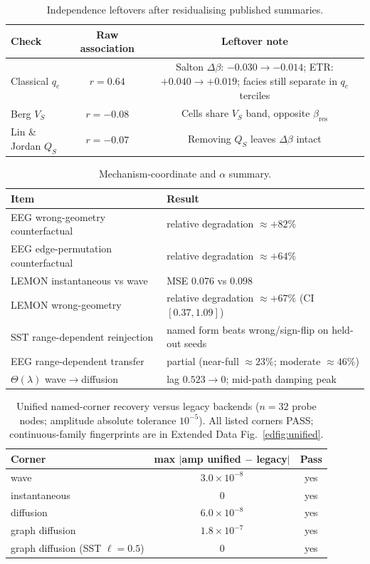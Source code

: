 \documentclass[twocolumn,10pt]{article}
\begin{document}
\begin{table}[!ht]
\centering
\caption{Independence leftovers after residualising published summaries.}
\label{stab:indep}
\begin{tabular}{lcc}
\toprule
Check & Raw association & Leftover note \\
\midrule
Classical \(q_c\) & \(r=0.64\) & Salton \(\Delta\beta\): \(-0.030\rightarrow-0.014\);
 ETR: \(+0.040\rightarrow+0.019\); facies still separate in \(q_c\) terciles \\
Berg \(V_S\) & \(r=-0.08\) & Cells share \(V_S\) band, opposite \(\beta_{\mathrm{res}}\) \\
Lin \& Jordan \(Q_S\) & \(r=-0.07\) & Removing \(Q_S\) leaves \(\Delta\beta\) intact \\
\bottomrule
\end{tabular}
\end{table}

\begin{table}[!ht]
\centering
\caption{Mechanism-coordinate and \(\alpha\) summary.}
\label{stab:alpha}
\begin{tabular}{lp{8.5cm}}
\toprule
Item & Result \\
\midrule
EEG wrong-geometry counterfactual & relative degradation \(\approx+82\%\) \\
EEG edge-permutation counterfactual & relative degradation \(\approx+64\%\) \\
LEMON instantaneous vs wave & MSE \(0.076\) vs \(0.098\) \\
LEMON wrong-geometry & relative degradation \(\approx+67\%\) (CI \([0.37,1.09]\)) \\
SST range-dependent reinjection & named form beats wrong/sign-flip on held-out seeds \\
EEG range-dependent transfer & partial (near-full \(\approx23\%\); moderate \(\approx46\%\)) \\
\(\Theta(\lambda)\) wave\(\rightarrow\)diffusion & lag \(0.523\rightarrow0\); mid-path damping peak \\
\bottomrule
\end{tabular}
\end{table}

\begin{table}[!ht]
\centering
\caption{Unified named-corner recovery versus legacy backends
(\(n=32\) probe nodes; amplitude absolute tolerance \(10^{-5}\)).
All listed corners PASS; continuous-family fingerprints are in Extended Data
Fig.~\ref{edfig:unified}.}
\label{stab:corners}
\begin{tabular}{lcc}
\toprule
Corner & max $|$amp unified $-$ legacy$|$ & Pass \\
\midrule
wave & \(3.0\times10^{-8}\) & yes \\
instantaneous & \(0\) & yes \\
diffusion & \(6.0\times10^{-8}\) & yes \\
graph diffusion & \(1.8\times10^{-7}\) & yes \\
graph diffusion (SST \(\ell=0.5\)) & \(0\) & yes \\
\bottomrule
\end{tabular}
\end{table}
\end{document}
